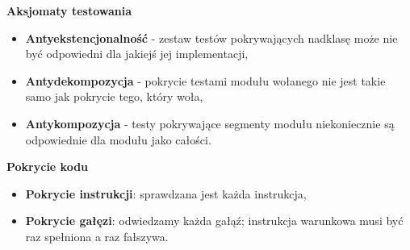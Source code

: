 \documentclass[../main.tex]{subfiles}
\begin{document}
    \textbf{Aksjomaty testowania}
    \begin{itemize}
        \item \textbf{Antyekstencjonalność} - zestaw testów pokrywających nadklasę może nie być odpowiedni
        dla jakiejś jej implementacji,
        \item \textbf{Antydekompozycja} - pokrycie testami modułu wołanego nie jest takie samo
        jak pokrycie tego, który woła,
        \item \textbf{Antykompozycja} - testy pokrywające segmenty modułu niekoniecznie są odpowiednie
        dla modułu jako całości.
    \end{itemize}


    \textbf{Pokrycie kodu}
    \begin{itemize}
        \item \textbf{Pokrycie instrukcji}: sprawdzana jest każda instrukcja,
        \item \textbf{Pokrycie gałęzi}: odwiedzamy każda gałąź; instrukcja warunkowa musi być raz spełniona a raz fałszywa.
    \end{itemize}
\end{document}
